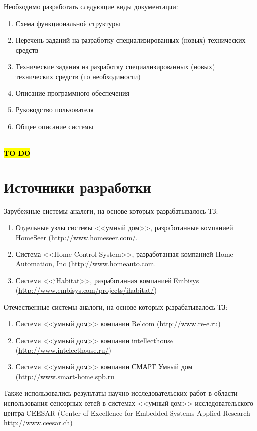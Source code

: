 \documentclass[a4paper, 12pt, titlepage]{article}
\begin{document}
Необходимо разработать следующие виды документации:
\begin{enumerate}
\item Схема функциональной структуры
\item Перечень заданий на разработку специализированных (новых) технических средств
\item Технические задания на разработку специализированных (новых) технических средств 
(по необходимости)
\item Описание программного обеспечения
\item Руководство пользователя
\item Общее описание системы
\end{enumerate}

\\
\hl{\bf TO DO}
\section{Источники разработки}

Зарубежные системы-аналоги, на основе которых разрабатывалось ТЗ:
\begin{enumerate}
\item Отдельные узлы системы <<умный дом>>, разработанные компанией HomeSeer 
(\url{http://www.homeseer.com/}.
\item Система <<Home Control System>>, разработанная компанией Home Automation, Inc 
(\url{http://www.homeauto.com}.
\item Система <<iHabitat>>, разработанная компанией Embisys 
(\url{http://www.embisys.com/projects/ihabitat/})
\end{enumerate}

Отечественные системы-аналоги, на основе которых разрабатывалось ТЗ:
\begin{enumerate}
\item Система <<умный дом>> компании Relcom 
(\url{http://www.re-e.ru})
\item Система <<умный дом>> компании intellecthouse 
(\url{http://www.intelecthouse.ru/})
\item Система <<умный дом>> компании СМАРТ Умный дом 
(\url{http://www.smart-home.spb.ru}
\end{enumerate}

Также использовались результаты научно-исследовательских работ в области использования 
сенсорных сетей в системах <<умный дом>> исследовательского центра CEESAR (Center of 
Excellence for Embedded Systems Applied Research \url{http://www.ceesar.ch})
\end{document}
